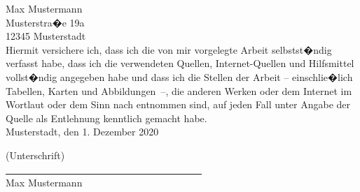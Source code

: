 \newpage



\text{ }
\vspace{13.5cm}


Max Mustermann\\
Musterstra�e 19a\\
12345 Musterstadt\\

Hiermit versichere ich, dass ich die von mir vorgelegte Arbeit selbstst�ndig verfasst habe, dass ich die verwendeten Quellen, Internet-Quellen und Hilfsmittel vollst�ndig angegeben habe und dass ich die Stellen der Arbeit -- einschlie�lich Tabellen, Karten und Abbildungen~--, die anderen Werken oder dem Internet im Wortlaut oder dem Sinn nach entnommen sind, auf jeden Fall unter Angabe der Quelle als Entlehnung kenntlich gemacht habe.\\

Musterstadt, den 1. Dezember 2020\\
\medskip
\medskip

(Unterschrift)\\
\underline{~~~~~~~~~~~~~~~~~~~~~~~~~~~~~~~~~~~~~~~~}\\
Max Mustermann\\



\newpage

